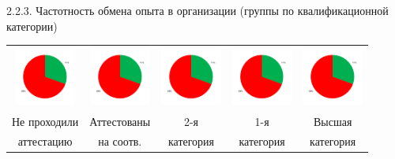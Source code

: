 \begin{frame}{2.2.3. Частотность обмена опыта в организации (группы по квалификационной категории) }
\begin{tabular}{ccccc}
\includegraphics[width=2cm, height=2cm]{diag.png} & 
\includegraphics[width=2cm, height=2cm]{diag.png} & 
\includegraphics[width=2cm, height=2cm]{diag.png} & 
\includegraphics[width=2cm, height=2cm]{diag.png} & 
\includegraphics[width=2cm, height=2cm]{diag.png} \\
 Не проходили &  Аттестованы & 2-я &  1-я  & Высшая \\ 
  аттестацию   &  на соотв. & категория &  категория  & категория \\ 
\end{tabular}

\end{frame}


